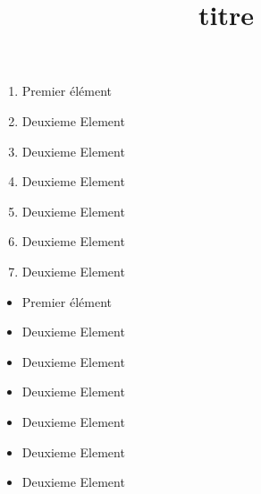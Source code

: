 \documentclass{article}
\title{titre}
\begin{document}
\maketitle

\begin{enumerate}
\item Premier élément
\item Deuxieme Element
\item Deuxieme Element
\item Deuxieme Element
\item Deuxieme Element
\item Deuxieme Element
\item Deuxieme Element
\end{enumerate}


\begin{itemize}
\item Premier élément
\item Deuxieme Element
\item Deuxieme Element
\item Deuxieme Element
\item Deuxieme Element
\item Deuxieme Element
\item Deuxieme Element
                       \end{itemize}
\end{document}

